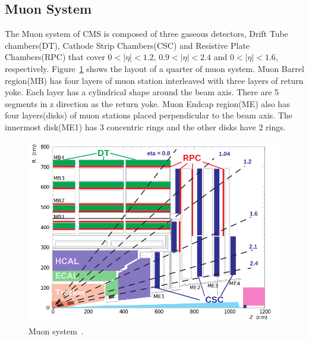 \subsection{Muon System} 

The Muon system of CMS is composed of three gaseous detectors, 
Drift Tube chambers(DT), Cathode Strip Chambers(CSC) and Resistive Plate Chambers(RPC) 
that cover $0<|\eta|<1.2$, $0.9<|\eta|<2.4$ and $0<|\eta|<1.6$, respectively.
Figure~\ref{fig:muon_system} shows the layout of a quarter of muon system. 
Muon Barrel region(MB) has four layers of muon station interleaved with 
three layers of return yoke. Each layer has a cylindrical shape around 
the beam axis. There are 5 segments in z direction as the return yoke. 
Muon Endcap region(ME) also has four layers(disks) of muon stations
placed perpendicular to the beam axis.
The innermost disk(ME1) has 3 concentric rings and the other disks 
have 2 rings. 
%
\begin{figure}[h] 
\vspace{1cm}
\includegraphics[width=0.99\textwidth]{figures/MuonSys-mod3.png}
\caption{Muon system~\cite{Kim:2012ix}.}
\label{fig:muon_system} 
\end{figure} 

